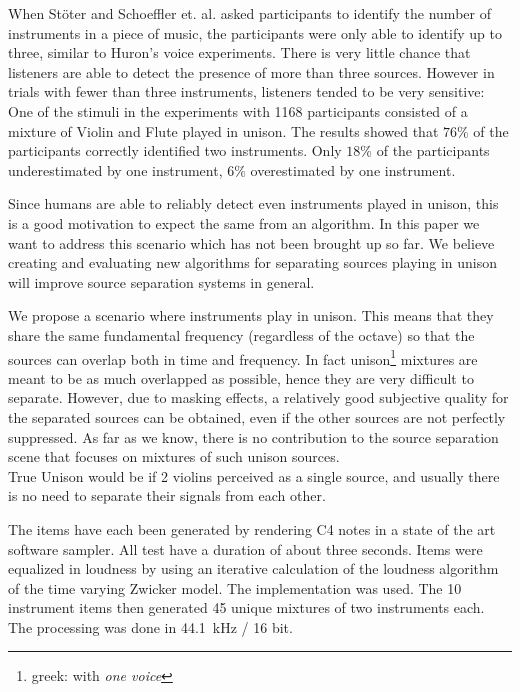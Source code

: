 
When St\"oter and Schoeffler et. al. \cite{stoeter13, schoeffler13} asked participants to identify the number of instruments in a piece of music, the participants were only able to identify up to three, similar to Huron's voice experiments. There is very little chance that listeners are able to detect the presence of more than three sources. However in trials with fewer than three instruments, listeners tended to be very sensitive: One of the stimuli in the \cite{stoeter13, schoeffler13} experiments with 1168 participants consisted of a mixture of Violin and Flute played in unison. The results showed that $76\%$ of the participants correctly identified two instruments. Only $18\%$ of the participants underestimated by one instrument, $6\%$ overestimated by one instrument.

Since humans are able to reliably detect even instruments played in unison, this is a good motivation to expect the same from an algorithm. In this paper we want to address this scenario which has not been brought up so far. We believe creating and evaluating new algorithms for separating sources playing in unison will improve source separation systems in general.

We propose a scenario where instruments play in unison. This means that they share the same fundamental frequency (regardless of the octave) so that the sources can overlap both in time and frequency. In fact unison\footnote{greek: with \emph{one voice}} mixtures are meant to be as much overlapped as possible, hence they are very difficult to separate. However, due to masking effects, a relatively good subjective quality for the separated sources can be obtained, even if the other sources are not perfectly suppressed.
As far as we know, there is no contribution to the source separation scene that focuses on mixtures of such unison sources. \\

True Unison would be if 2 violins perceived as a single source, and usually there is no need to separate their signals from each other.

The items have each been generated by rendering C4 notes in a state of the art software sampler. All test have a duration of about three seconds. Items were equalized in loudness by using an iterative calculation of the loudness algorithm of the time varying Zwicker model. The implementation \cite{genesis12} was used. The 10 instrument items then generated 45 unique mixtures of two instruments each. The processing was done in 44.1~kHz / 16 bit.

